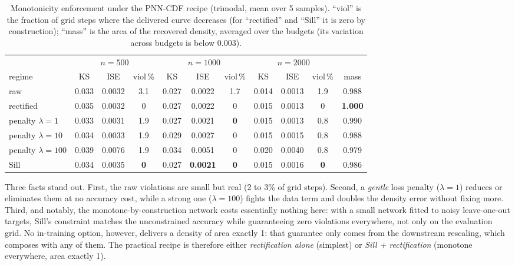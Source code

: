 \documentclass[11pt]{article}
\begin{document}
\begin{table}[H]
\centering
\small\setlength{\tabcolsep}{4pt}
\begin{tabular}{lccc@{\hskip 4mm}ccc@{\hskip 4mm}ccc@{\hskip 4mm}c}
\toprule
 & \multicolumn{3}{c}{$n=500$} & \multicolumn{3}{c}{$n=1000$} & \multicolumn{3}{c}{$n=2000$} & \\
\cmidrule(lr){2-4}\cmidrule(lr){5-7}\cmidrule(lr){8-10}
regime & KS & ISE & viol\,\% & KS & ISE & viol\,\% & KS & ISE & viol\,\% & mass \\
\midrule
raw                 & 0.033 & 0.0032 & 3.1 & 0.027 & 0.0022 & 1.7 & 0.014 & 0.0013 & 1.9 & 0.988 \\
rectified           & 0.035 & 0.0032 & 0   & 0.027 & 0.0022 & 0   & 0.015 & 0.0013 & 0   & \textbf{1.000} \\
penalty $\lambda=1$   & 0.033 & 0.0031 & 1.9 & 0.027 & 0.0021 & \textbf{0} & 0.015 & 0.0013 & 0.8 & 0.990 \\
penalty $\lambda=10$  & 0.034 & 0.0033 & 1.9 & 0.029 & 0.0027 & 0   & 0.015 & 0.0015 & 0.8 & 0.988 \\
penalty $\lambda=100$ & 0.039 & 0.0076 & 1.9 & 0.034 & 0.0051 & 0   & 0.020 & 0.0040 & 0.8 & 0.979 \\
Sill                & 0.034 & 0.0035 & \textbf{0} & 0.027 & \textbf{0.0021} & \textbf{0} & 0.015 & 0.0016 & \textbf{0} & 0.986 \\
\bottomrule
\end{tabular}
\caption{Monotonicity enforcement under the PNN-CDF recipe (trimodal, mean over 5 samples).
``viol'' is the fraction of grid steps where the delivered curve decreases (for
``rectified'' and ``Sill'' it is zero by construction); ``mass'' is the area of the
recovered density, averaged over the budgets (its variation across budgets is below
$0.003$).}
\label{tab:mono}
\end{table}

Three facts stand out. First, the raw violations are small but real (2 to 3\% of grid
steps). Second, a \emph{gentle} loss penalty ($\lambda = 1$) reduces or eliminates them at
no accuracy cost, while a strong one ($\lambda = 100$) fights the data term and doubles the
density error without fixing more. Third, and notably, the monotone-by-construction network
costs essentially nothing here: with a small network fitted to noisy leave-one-out targets,
Sill's constraint matches the unconstrained accuracy while guaranteeing zero violations
everywhere, not only on the evaluation grid. No in-training option, however, delivers a
density of area exactly 1: that guarantee only comes from the downstream rescaling, which
composes with any of them. The practical recipe is therefore either
\emph{rectification alone} (simplest) or \emph{Sill + rectification} (monotone everywhere,
area exactly 1).
\end{document}

